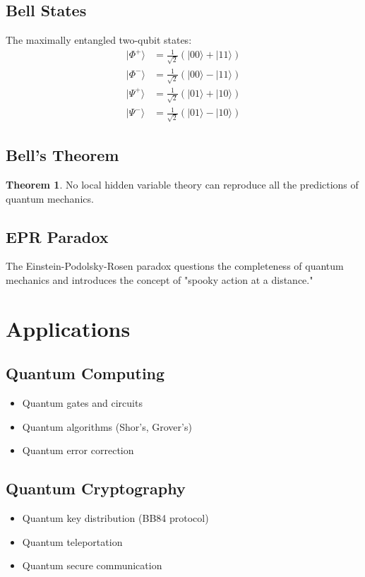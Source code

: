 \documentclass[11pt]{article}
\theoremstyle{definition}
\newtheorem{theorem}{Theorem}[section]
\begin{document}
\subsection{Bell States}
The maximally entangled two-qubit states:
\begin{align}
|\Phi^+\rangle &= \frac{1}{\sqrt{2}}(|00\rangle + |11\rangle) \\
|\Phi^-\rangle &= \frac{1}{\sqrt{2}}(|00\rangle - |11\rangle) \\
|\Psi^+\rangle &= \frac{1}{\sqrt{2}}(|01\rangle + |10\rangle) \\
|\Psi^-\rangle &= \frac{1}{\sqrt{2}}(|01\rangle - |10\rangle)
\end{align}

\subsection{Bell's Theorem}
\begin{theorem}
No local hidden variable theory can reproduce all the predictions of quantum mechanics.
\end{theorem}

\subsection{EPR Paradox}
The Einstein-Podolsky-Rosen paradox questions the completeness of quantum mechanics and introduces the concept of "spooky action at a distance."

\section{Applications}

\subsection{Quantum Computing}
\begin{itemize}
    \item Quantum gates and circuits
    \item Quantum algorithms (Shor's, Grover's)
    \item Quantum error correction
\end{itemize}

\subsection{Quantum Cryptography}
\begin{itemize}
    \item Quantum key distribution (BB84 protocol)
    \item Quantum teleportation
    \item Quantum secure communication
\end{itemize}
\end{document}
